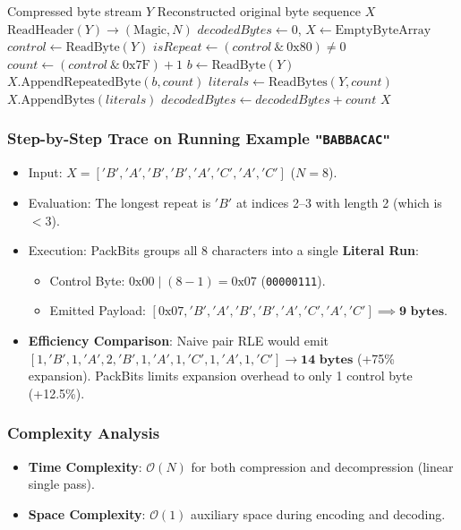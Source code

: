 \documentclass[12pt,a4paper]{article}
\begin{document}
\begin{algorithm}[H]
\caption{PackBits Flag RLE Decompression}
\begin{algorithmic}[1]
\Require Compressed byte stream $Y$
\Ensure Reconstructed original byte sequence $X$
\State $\text{ReadHeader}(Y) \to (\text{Magic}, N)$
\State $decodedBytes \gets 0$, $X \gets \text{EmptyByteArray}$
    \State $control \gets \text{ReadByte}(Y)$
    \State $isRepeat \gets (control \ \& \ 0\text{x}80) \neq 0$
    \State $count \gets (control \ \& \ 0\text{x}7\text{F}) + 1$
        \State $b \gets \text{ReadByte}(Y)$
        \State $X.\text{AppendRepeatedByte}(b, count)$
    \Else
        \State $literals \gets \text{ReadBytes}(Y, count)$
        \State $X.\text{AppendBytes}(literals)$
    \EndIf
    \State $decodedBytes \gets decodedBytes + count$
\EndWhile
\State \Return $X$
\end{algorithmic}
\end{algorithm}

\subsubsection{Step-by-Step Trace on Running Example \texttt{"BABBACAC"}}
\begin{itemize}
    \item Input: $X = ['B', 'A', 'B', 'B', 'A', 'C', 'A', 'C']$ ($N = 8$).
    \item Evaluation: The longest repeat is $'B'$ at indices 2--3 with length 2 (which is $< 3$).
    \item Execution: PackBits groups all 8 characters into a single \textbf{Literal Run}:
    \begin{itemize}
        \item Control Byte: $0\text{x}00 \mid (8 - 1) = 0\text{x}07$ (\texttt{00000111}).
        \item Emitted Payload: $[0\text{x}07, 'B', 'A', 'B', 'B', 'A', 'C', 'A', 'C'] \implies \mathbf{9\text{ bytes}}$.
    \end{itemize}
    \item \textbf{Efficiency Comparison}: Naive pair RLE would emit $[1,'B', 1,'A', 2,'B', 1,'A', 1,'C', 1,'A', 1,'C'] \to \mathbf{14\text{ bytes}}$ (+75\% expansion). PackBits limits expansion overhead to only 1 control byte (+12.5\%).
\end{itemize}

\subsubsection{Complexity Analysis}
\begin{itemize}
    \item \textbf{Time Complexity}: $\mathcal{O}(N)$ for both compression and decompression (linear single pass).
    \item \textbf{Space Complexity}: $\mathcal{O}(1)$ auxiliary space during encoding and decoding.
\end{itemize}
\end{document}

